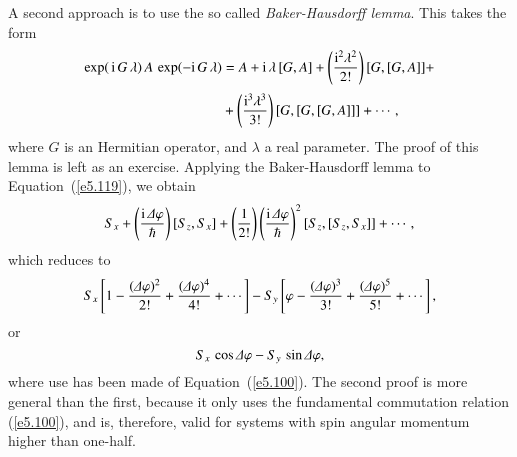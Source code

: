 A second approach is to use the so called {\em Baker-Hausdorff lemma}. This
takes the form
\begin{align}
\exp(\,{\rm i}\, G\,\lambda)\,A\, \exp(-{\rm i} \,G \,\lambda)&= A + {\rm i} \,\lambda\,
[G,A] + \left(\frac{{\rm i}^2 \lambda^2}{2!}\right) [G, [G,A]]+\nonumber\\[0.5ex]
&+   
\left(\frac{{\rm i}^3\lambda^3}{3!}\right)[G, [G, [G,A]]]+\cdots,\label{e5.123}
\end{align}
where $G$ is an Hermitian operator, and $\lambda$ a real parameter. The proof
of this lemma is left as an exercise. Applying the Baker-Hausdorff lemma
to Equation~(\ref{e5.119}), we obtain 
\begin{equation}
S_x + \left(\frac{{\rm i}\,{\mit\Delta}\varphi}{\hbar}\right) [S_z, S_x]
+ \left(\frac{1}{2!}\right) \left(\frac{{\rm i}\,{\mit\Delta}\varphi}{\hbar}\right)^2
[S_z, [S_z, S_x]] + \cdots,
\end{equation}
which reduces to 
\begin{equation}
S_x\left[ 1- \frac{({\mit\Delta}\varphi)^2}{2!} + \frac{({\mit\Delta}\varphi)^4}{4!} + \cdots\right] - S_y \left[\varphi - 
\frac{({\mit\Delta}\varphi)^3}{3!}+  \frac{({\mit\Delta}\varphi)^5}{5!} +\cdots\right],
\end{equation}
or
\begin{equation}
S_x\,\cos{\mit\Delta}\varphi - S_y\,\sin{\mit\Delta}\varphi,
\end{equation}
where  use has been made of Equation~(\ref{e5.100}). The second
proof is more general than the first, because it only uses the fundamental
 commutation relation (\ref{e5.100}), and is, therefore, valid for systems with spin
angular momentum higher than one-half.

